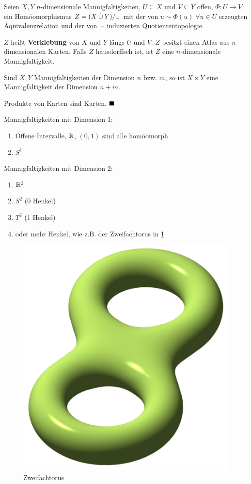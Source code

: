 \begin{definition}%
    Seien $X, Y$ $n$-dimensionale Mannigfaltigkeiten, $U \subseteq X$
    und $V \subseteq Y$ offen, $\Phi: U \rightarrow V$ ein Homöomorphismus
    $Z = (X \mathbin{\dot{\cup}} Y) /_\sim$ mit der von $u \sim \Phi(u)\;\forall{u \in U}$
    erzeugten Äquivalenzrelation und der von $\sim$ induzierten 
    Quotiententopologie.

    $Z$ heißt \textbf{Verklebung} von $X$ und $Y$ längs $U$ und $V$.
    $Z$ besitzt einen Atlas aus $n$-dimensionalen Karten.
    Falls $Z$ hausdorffsch ist, ist $Z$ eine $n$-dimensionale 
    Mannigfaltigkeit.
\end{definition}

\begin{bemerkung}
    Sind $X, Y$ Mannigfaltigkeiten der Dimension $n$ bzw. $m$, so ist
    $X \times Y$ eine Mannigfaltigkeit der Dimension $n+m$.
\end{bemerkung}

\begin{beweis}
    Produkte von Karten sind Karten. $\qed$
\end{beweis}

\begin{beispiel}
    Mannigfaltigkeiten mit Dimension 1:
    \begin{enumerate}[label=\arabic*)]
        \item Offene Intervalle, $\mathbb{R}$, $(0,1)$ sind alle homöomorph
        \item $S^1$
    \end{enumerate}

    Mannigfaltigkeiten mit Dimension 2:
    \begin{enumerate}[label=\arabic*)]
        \item $\mathbb{R}^2$
        \item $S^2$ (0 Henkel)
        \item $T^2$ (1 Henkel)
        \item oder mehr Henkel, wie z.B. der Zweifachtorus in \cref{fig:double-torus}
    \end{enumerate}

    \begin{figure}[htp]
        \centering
        \includegraphics[width=0.2\linewidth, keepaspectratio]{figures/Double-torus-illustration.png}
        \caption{Zweifachtorus}
        \label{fig:double-torus}
    \end{figure}
\end{beispiel}

